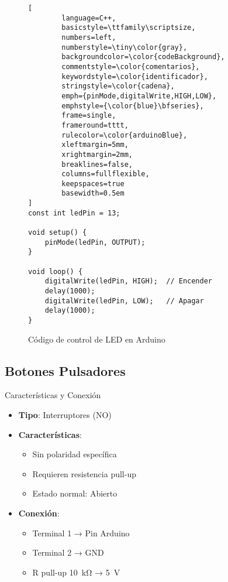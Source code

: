 \begin{figure}[H]
	\centering
	\begin{lstlisting}[
		language=C++,
		basicstyle=\ttfamily\scriptsize,
		numbers=left,
		numberstyle=\tiny\color{gray},
		backgroundcolor=\color{codeBackground},
		commentstyle=\color{comentarios},
		keywordstyle=\color{identificador},
		stringstyle=\color{cadena},
		emph={pinMode,digitalWrite,HIGH,LOW},
		emphstyle={\color{blue}\bfseries},
		frame=single,
		frameround=tttt,
		rulecolor=\color{arduinoBlue},
		xleftmargin=5mm,
		xrightmargin=2mm,
		breaklines=false,
		columns=fullflexible,
		keepspaces=true
		basewidth=0.5em 
]
const int ledPin = 13;

void setup() {
	pinMode(ledPin, OUTPUT);
}

void loop() {
	digitalWrite(ledPin, HIGH);  // Encender
	delay(1000);
	digitalWrite(ledPin, LOW);   // Apagar
	delay(1000);
}
	\end{lstlisting}
	\caption{Código de control de LED en Arduino}
	\label{fig:codigo-led}
\end{figure}

\subsection{Botones Pulsadores}
\begin{componentBox}{Características y Conexión \citep{scherz2016practical}}
	\begin{itemize}[leftmargin=*,itemsep=1pt,parsep=1pt]
		\item \textbf{Tipo}: Interruptores (NO)
		\item \textbf{Características}:
		\begin{itemize}[itemsep=0pt,parsep=0pt]
			\item Sin polaridad específica
			\item Requieren resistencia pull-up
			\item Estado normal: Abierto
		\end{itemize}
		\item \textbf{Conexión}:
		\begin{itemize}[itemsep=0pt,parsep=0pt]
			\item Terminal 1 → Pin Arduino
			\item Terminal 2 → GND
			\item R pull-up \SI{10}{\kilo\ohm} → \SI{5}{\volt}
		\end{itemize}
	\end{itemize}
\end{componentBox}

